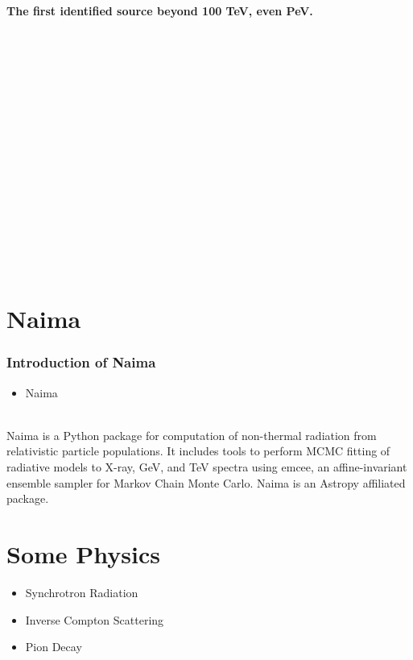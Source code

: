 \documentclass[9pt, mathserif]{beamer}
\begin{document}
\begin{frame}
            \noindent \textbf{The first identified source beyond 100 TeV, even PeV.}
            \phantom{0}\\
            \phantom{0}\\
            \phantom{0}\\
            \phantom{0}\\
            \phantom{0}\\
            \phantom{0}\\
            \phantom{0}\\
            \phantom{0}\\
            \phantom{0}\\
            \phantom{0}\\
            \phantom{0}\\
            \phantom{0}\\
            \phantom{0}\\
            \phantom{0}\\
            \phantom{0}\\
            \phantom{0}\\
            \phantom{0}\\
        \end{frame}

    \section{Naima}
        \begin{frame}
            \frametitle{Introduction of Naima}
            \begin{itemize}
                \item \huge{Naima}
            \end{itemize}
            
            \phantom{0}\\

            Naima is a Python package for computation of non-thermal radiation from relativistic particle populations. It includes tools to perform MCMC fitting of radiative models to X-ray, GeV, and TeV spectra using emcee, an affine-invariant ensemble sampler for Markov Chain Monte Carlo. Naima is an Astropy affiliated package.
        \end{frame}

    \section{Some Physics}
        \begin{frame}
            \huge{
            \begin{itemize}
                \item Synchrotron Radiation
                \item Inverse Compton Scattering
                \item Pion Decay
            \end{itemize}}
        \end{frame}
\end{document}
